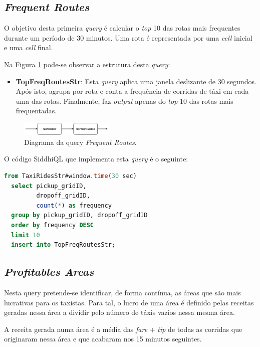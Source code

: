 \documentclass[article]{IEEEtran}
\begin{document}
\subsection{\textit{Frequent Routes}}

O objetivo desta primeira \textit{query} é calcular o \textit{top} 10 das rotas mais frequentes durante um período de 30 minutos. Uma rota é representada por uma \textit{cell} inicial e uma \textit{cell} final.

Na Figura \ref{fig:frequentRoutesDiagram} pode-se observar a estrutura desta \textit{query}:
\begin{itemize}
    \item \textbf{TopFreqRoutesStr}: Esta \textit{query} aplica uma janela deslizante de 30 segundos. Após isto, agrupa por rota e conta a frequência de corridas de táxi em cada uma das rotas. Finalmente, faz \textit{output} apenas do \textit{top} 10 das rotas mais frequentadas. 
\end{itemize} 

\begin{figure}[hbtp]
    \centering
        \includegraphics[width=0.4\textwidth]{images/frequentRoutes}
    \caption{Diagrama da query \textit{Frequent Routes}.}
    \label{fig:frequentRoutesDiagram}
\end{figure}

O código SiddhiQL que implementa esta \textit{query} é o seguinte:

\begin{lstlisting}[language=SQL]
  from TaxiRidesStr#window.time(30 sec)
  select pickup_gridID,
         dropoff_gridID,
         count(*) as frequency
  group by pickup_gridID, dropoff_gridID
  order by frequency DESC
  limit 10
  insert into TopFreqRoutesStr;
\end{lstlisting}

\subsection{\textit{Profitables Areas}}

Nesta query pretende-se identificar, de forma contínua, as áreas que são mais lucrativas para os taxistas. Para tal, o lucro de uma área é definido pelas receitas geradas nessa área a dividir pelo número de táxis vazios nessa mesma área.

A receita gerada numa área é a média das \textit{fare} + \textit{tip} de todas as corridas que originaram nessa área e que acabaram nos 15 minutos seguintes.
\end{document}
